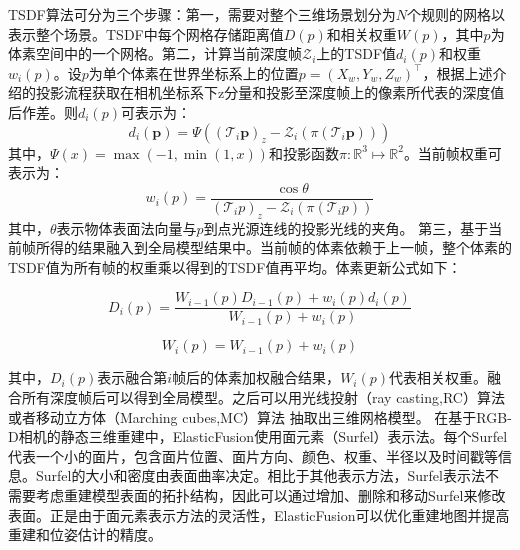 TSDF算法可分为三个步骤：第一，需要对整个三维场景划分为$N$个规则的网格以表示整个场景。TSDF中每个网格存储距离值$D(p)$和相关权重$W(p)$，其中$p$为体素空间中的一个网格。第二，计算当前深度帧$\mathcal{Z}_{i}$上的TSDF值$d_i(p)$和权重$w_i(p)$。设$p$为单个体素在世界坐标系上的位置$p = (X_w,Y_w,Z_w)^\top$，根据上述介绍的投影流程获取在相机坐标系下z分量和投影至深度帧上的像素所代表的深度值后作差。则$d_i(p)$可表示为：
\begin{equation}
d_{i}(\boldsymbol{p})=\Psi\left(\left(\mathcal{T}_{i} \boldsymbol{p}\right)_{z}-\mathcal{Z}_{i}\left(\pi\left(\mathcal{T}_{i} \boldsymbol{p}\right)\right)\right) 
\end{equation}
其中，$\Psi(x) =\max \left(-1,\min \left(1,x\right)\right)$和投影函数$ \pi: \mathbb{R}^{3} \mapsto \mathbb{R}^{2}$。当前帧权重可表示为：
\begin{equation}
w_i(p) = \frac{ \cos \theta} { \left(\mathcal{T}_{i} p\right)_{z}-\mathcal{Z}_{i}\left(\pi\left(\mathcal{T}_{i}p\right)\right)} 
\end{equation}其中，$\theta$表示物体表面法向量与$p$到点光源连线的投影光线的夹角。
第三，基于当前帧所得的结果融入到全局模型结果中。当前帧的体素依赖于上一帧，整个体素的TSDF值为所有帧的权重乘以得到的TSDF值再平均。体素更新公式如下：


\begin{equation}
D_{i}(p)=\frac{W_{i-1}(p) D_{i-1}(p)+w_{i}(p) d_{i}(p)}{W_{i-1}(p)+w_{i}(p)}
\end{equation}
\vspace{-10ex}

\begin{equation}
W_{i}(p)=W_{i-1}(p)+w_{i}(p)
\end{equation}

\noindent 其中，$D_i(p)$表示融合第$i$帧后的体素加权融合结果，$W_i(p)$代表相关权重。融合所有深度帧后可以得到全局模型。之后可以用光线投射（ray casting,RC）算法或者移动立方体（Marching cubes,MC）算法 抽取出三维网格模型。
在基于RGB-D相机的静态三维重建中，ElasticFusion使用面元素（Surfel）表示法。每个Surfel代表一个小的面片，包含面片位置、面片方向、颜色、权重、半径以及时间戳等信息。Surfel的大小和密度由表面曲率决定。相比于其他表示方法，Surfel表示法不需要考虑重建模型表面的拓扑结构，因此可以通过增加、删除和移动Surfel来修改表面。正是由于面元素表示方法的灵活性，ElasticFusion可以优化重建地图并提高重建和位姿估计的精度。\par

